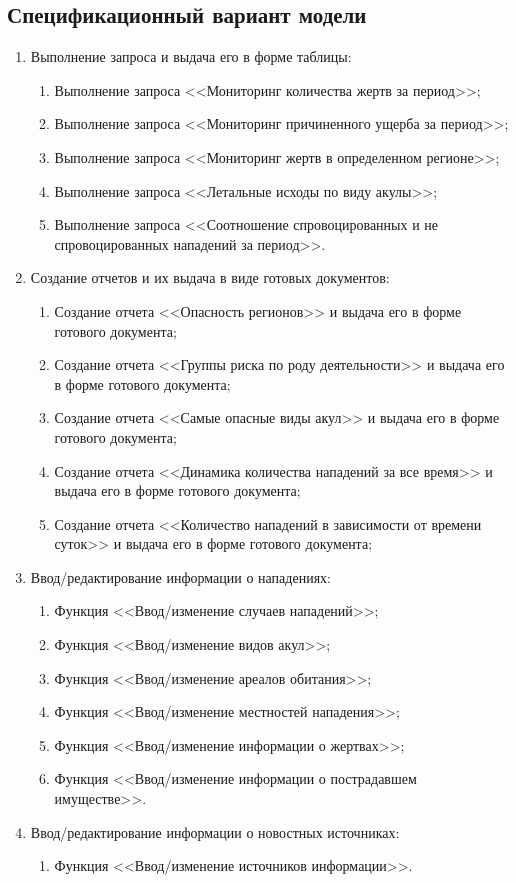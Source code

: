 \documentclass[russian,utf8,simple,emptystyle]{eskdtext}
\begin{document}
\subsection{Спецификационный вариант модели}
\begin{enumerate}
	\item Выполнение запроса и выдача его в форме таблицы:
	\begin{enumerate}
		\item Выполнение запроса <<Мониторинг количества жертв за период>>;
		\item Выполнение запроса <<Мониторинг причиненного ущерба за период>>;
		\item Выполнение запроса <<Мониторинг жертв в определенном регионе>>;
		\item Выполнение запроса <<Летальные исходы по виду акулы>>;
		\item Выполнение запроса <<Соотношение спровоцированных и не спровоцированных нападений за период>>.
	\end{enumerate}
	
	\item Создание отчетов и их выдача в виде готовых документов:
	\begin{enumerate}
		\item Создание отчета <<Опасность регионов>> и выдача его в форме готового документа;
		\item Создание отчета <<Группы риска по роду деятельности>> и выдача его в форме готового документа;
		\item Создание отчета <<Самые опасные виды акул>> и выдача его в форме готового документа;
		\item Создание отчета <<Динамика количества нападений за все время>> и выдача его в форме готового документа;
		\item Создание отчета <<Количество нападений в зависимости от времени суток>> и выдача его в форме готового документа;
	\end{enumerate}
	
	\item Ввод/редактирование информации о нападениях:
	\begin{enumerate}
		\item Функция <<Ввод/изменение случаев нападений>>;
		\item Функция <<Ввод/изменение видов акул>>;
		\item Функция <<Ввод/изменение ареалов обитания>>;
		\item Функция <<Ввод/изменение местностей нападения>>;
		\item Функция <<Ввод/изменение информации о жертвах>>;
		\item Функция <<Ввод/изменение информации о пострадавшем имуществе>>.
	\end{enumerate}
	
	\item Ввод/редактирование информации о новостных источниках:
	\begin{enumerate}
		\item Функция <<Ввод/изменение источников информации>>.
	\end{enumerate}
\end{enumerate}
\clearpage
\end{document}
